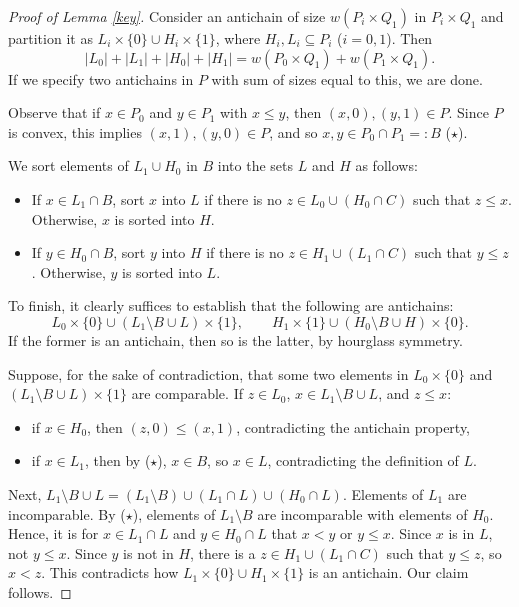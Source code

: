 \documentclass[12pt]{article}
\begin{document}
\begin{proof}[Proof of Lemma \ref{key}]
Consider an antichain of size $w(P_i\times Q_1)$ in $P_i\times Q_1$ and partition it as $L_i\times \{0\}\cup H_i\times \{1\}$, where $H_i,L_i\subseteq P_i$ ($i=0,1$). Then
$$|L_0|+|L_1|+|H_0|+|H_1|=w(P_0\times Q_1)+w(P_1\times Q_1).$$
If we specify two antichains in $P$ with sum of sizes equal to this, we are done.

Observe that if $x\in P_0$ and $y\in P_1$ with $x\le y$, then $(x,0),(y,1)\in P$. Since $P$ is convex, this implies $(x,1),(y,0)\in P$, and so $x,y\in P_0\cap P_1=:B$ ($\star$).

We sort elements of $L_1\cup H_0$ in $B$ into the sets $L$ and $H$ as follows:
\begin{itemize}
    \item If $x\in L_1\cap B$, sort $x$ into $L$ if there is no $z\in L_0\cup (H_0\cap C)$ such that $z\le x$. Otherwise, $x$ is sorted into $H$.
    \item If $y\in H_0\cap B$, sort $y$ into $H$ if there is no $z\in H_1\cup (L_1\cap C)$ such that $y\le z$. Otherwise, $y$ is sorted into $L$.
\end{itemize}

To finish, it clearly suffices to establish that the following are antichains:
$$L_0\times\{0\}\cup (L_1\setminus B\cup L)\times \{1\},\qquad H_1\times\{1\}\cup (H_0\setminus B\cup H)\times \{0\}.$$
If the former is an antichain, then so is the latter, by hourglass symmetry.

Suppose, for the sake of contradiction, that some two elements in $L_0\times\{0\}$ and $(L_1\setminus B\cup L)\times \{1\}$ are comparable. If $z\in L_0$, $x\in L_1\setminus B\cup L$, and $z\le x$:
\begin{itemize}
    \item if $x\in H_0$, then $(z,0)\le (x,1)$, contradicting the antichain property,
    \item if $x\in L_1$, then by ($\star$), $x\in B$, so $x\in L$, contradicting the definition of $L$.
\end{itemize}
Next, $L_1\setminus B\cup L=(L_1\setminus B)\cup (L_1\cap L)\cup (H_0\cap L)$. Elements of $L_1$ are incomparable. By ($\star$), elements of $L_1\setminus B$ are incomparable with elements of $H_0$. Hence, it is for $x\in L_1\cap L$ and $y\in H_0\cap L$ that $x<y$ or $y\le x$. Since $x$ is in $L$, not $y\le x$. Since $y$ is not in $H$, there is a $z\in H_1\cup (L_1\cap C)$ such that $y\le z$, so $x<z$. This contradicts how $L_1\times \{0\}\cup H_1\times \{1\}$ is an antichain. Our claim follows. \end{proof}
\end{document}
